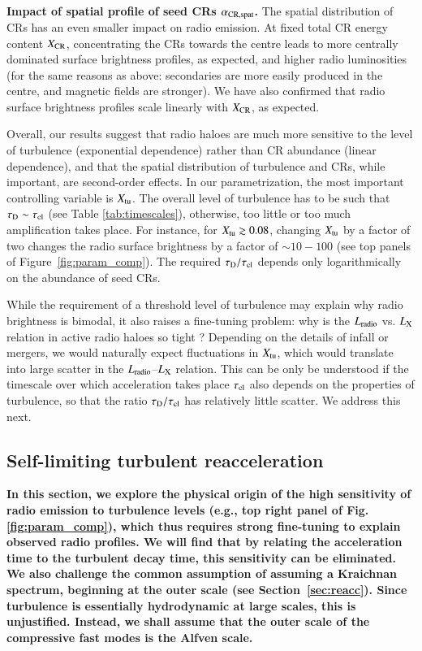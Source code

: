 \documentclass[fleqn,usenatbib,useAMS]{mnras}
\newcommand\C[1]{{\bf #1}}
\begin{document}
{\bf Impact of spatial profile of seed CRs $\alpha_{\rm CR, spat}$.} The spatial distribution of CRs has an even smaller impact on radio emission. At fixed total CR energy content $X_{\rm CR}$, concentrating the CRs towards the centre leads to more centrally dominated surface brightness profiles, as expected, and higher radio luminosities (for the same reasons as above: secondaries are more easily produced in the centre, and magnetic fields are stronger). We have also confirmed that radio surface brightness profiles scale linearly with $X_{\rm CR}$, as expected. 

Overall, our results suggest that radio haloes are much more sensitive to the level of turbulence (exponential dependence) rather than CR abundance (linear dependence), and that the spatial distribution of turbulence and CRs, while important, are second-order effects. In our parametrization, the most important controlling variable is $X_{\rm tu}$. The overall level of turbulence has to be such that $\tau_{\rm D} \sim \tau_{\rm cl}$ (see Table \ref{tab:timescales}), otherwise, too little or too much amplification takes place. For instance, for $X_{\mathrm{tu}}\gtrsim0.08$, changing $X_{\mathrm{tu}}$ by a factor of two changes the radio surface brightness by a factor of $\sim 10-100$ (see top panels of Figure~\ref{fig:param_comp}). The required $\tau_{\rm D}/\tau_{\rm cl}$ depends only logarithmically on the abundance of seed CRs.

While the requirement of a threshold level of turbulence may explain why radio brightness is bimodal, it also raises a fine-tuning problem: why is the $L_{\rm radio}$ vs. $L_{\rm X}$ relation in active radio haloes so tight \citep{Brunetti2009}? Depending on the details of infall or mergers, we would naturally expect fluctuations in $X_{\rm tu}$, which would translate into large scatter in the $L_{\rm radio}$--$L_{\rm X}$ relation. This can be only be understood if the timescale over which acceleration takes place $\tau_{\rm cl}$ also depends on the properties of turbulence, so that the ratio $\tau_{\rm D}/\tau_{\rm cl}$ has relatively little scatter. We address this next. 

\subsection{Self-limiting turbulent reacceleration}
\label{sect:self-limiting} 

\C{In this section, we explore the physical origin of the high sensitivity of radio emission to turbulence levels (e.g., top right panel of Fig. \ref{fig:param_comp}), which thus requires strong fine-tuning to explain observed radio profiles. We will find that by relating the acceleration time to the turbulent decay time, this sensitivity can be eliminated.  We also challenge the common assumption of assuming a Kraichnan spectrum, beginning at the outer scale (see Section~\ref{sec:reacc}). Since turbulence is essentially hydrodynamic at large scales, this is unjustified. Instead, we shall assume that the outer scale of the compressive fast modes is the Alfven scale.}
\end{document}
